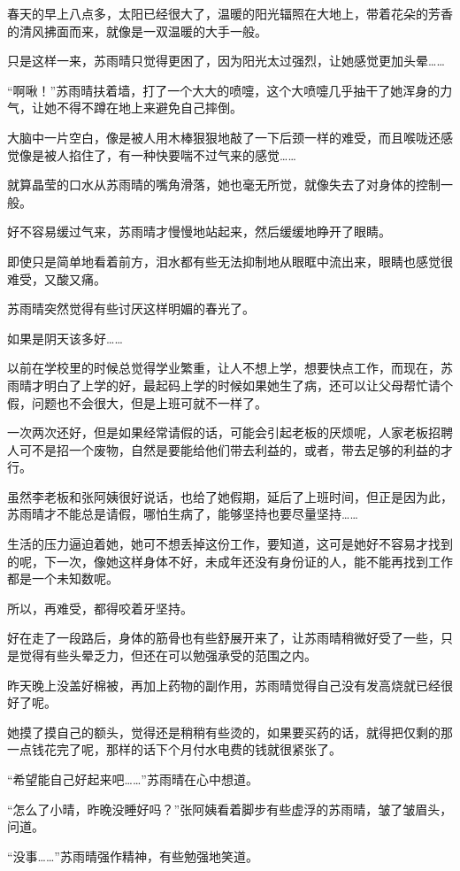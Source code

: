 春天的早上八点多，太阳已经很大了，温暖的阳光辐照在大地上，带着花朵的芳香的清风拂面而来，就像是一双温暖的大手一般。

只是这样一来，苏雨晴只觉得更困了，因为阳光太过强烈，让她感觉更加头晕……

“啊啾！”苏雨晴扶着墙，打了一个大大的喷嚏，这个大喷嚏几乎抽干了她浑身的力气，让她不得不蹲在地上来避免自己摔倒。

大脑中一片空白，像是被人用木棒狠狠地敲了一下后颈一样的难受，而且喉咙还感觉像是被人掐住了，有一种快要喘不过气来的感觉……

就算晶莹的口水从苏雨晴的嘴角滑落，她也毫无所觉，就像失去了对身体的控制一般。

好不容易缓过气来，苏雨晴才慢慢地站起来，然后缓缓地睁开了眼睛。

即使只是简单地看着前方，泪水都有些无法抑制地从眼眶中流出来，眼睛也感觉很难受，又酸又痛。

苏雨晴突然觉得有些讨厌这样明媚的春光了。

如果是阴天该多好……

以前在学校里的时候总觉得学业繁重，让人不想上学，想要快点工作，而现在，苏雨晴才明白了上学的好，最起码上学的时候如果她生了病，还可以让父母帮忙请个假，问题也不会很大，但是上班可就不一样了。

一次两次还好，但是如果经常请假的话，可能会引起老板的厌烦呢，人家老板招聘人可不是招一个废物，自然是要能给他们带去利益的，或者，带去足够的利益的才行。

虽然李老板和张阿姨很好说话，也给了她假期，延后了上班时间，但正是因为此，苏雨晴才不能总是请假，哪怕生病了，能够坚持也要尽量坚持……

生活的压力逼迫着她，她可不想丢掉这份工作，要知道，这可是她好不容易才找到的呢，下一次，像她这样身体不好，未成年还没有身份证的人，能不能再找到工作都是一个未知数呢。

所以，再难受，都得咬着牙坚持。

好在走了一段路后，身体的筋骨也有些舒展开来了，让苏雨晴稍微好受了一些，只是觉得有些头晕乏力，但还在可以勉强承受的范围之内。

昨天晚上没盖好棉被，再加上药物的副作用，苏雨晴觉得自己没有发高烧就已经很好了呢。

她摸了摸自己的额头，觉得还是稍稍有些烫的，如果要买药的话，就得把仅剩的那一点钱花完了呢，那样的话下个月付水电费的钱就很紧张了。

“希望能自己好起来吧……”苏雨晴在心中想道。

“怎么了小晴，昨晚没睡好吗？”张阿姨看着脚步有些虚浮的苏雨晴，皱了皱眉头，问道。

“没事……”苏雨晴强作精神，有些勉强地笑道。

